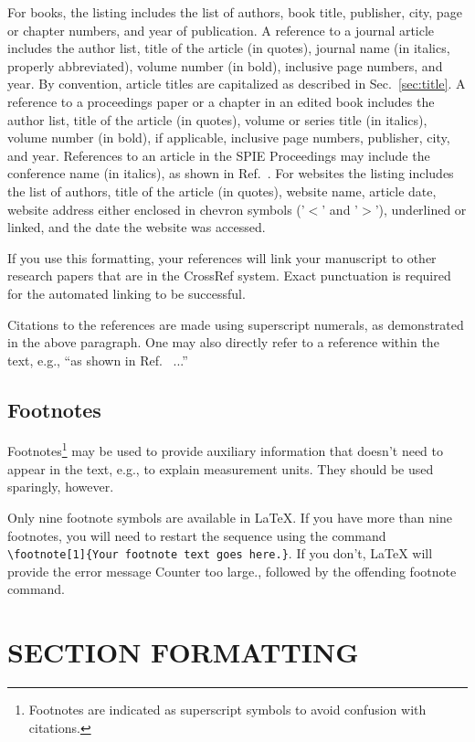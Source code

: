 \documentclass[]{spie}  %
\begin{document}
For books\cite{Lamport94,Alred03,Goossens97}, the listing includes the list of authors, book title, publisher, city, page or chapter numbers, and year of publication.  A reference to a journal article\cite{Metropolis53} includes the author list, title of the article (in quotes), journal name (in italics, properly abbreviated), volume number (in bold), inclusive page numbers, and year.  By convention\cite{Lamport94}, article titles are capitalized as described in Sec.~\ref{sec:title}.  A reference to a proceedings paper or a chapter in an edited book\cite{Gull89a} includes the author list, title of the article (in quotes), volume or series title (in italics), volume number (in bold), if applicable, inclusive page numbers, publisher, city, and year.  References to an article in the SPIE Proceedings may include the conference name (in italics), as shown in Ref.~. For websites\cite{Lees-Miller-LaTeX-course-1} the listing includes the list of authors, title of the article (in quotes), website name, article date, website address either enclosed in chevron symbols ('\(<\)' and '\(>\)'),  underlined or linked, and the date the website was accessed. 

If you use this formatting, your references will link your manuscript to other research papers that are in the CrossRef system. Exact punctuation is required for the automated linking to be successful. 

Citations to the references are made using superscript numerals, as demonstrated in the above paragraph.  One may also directly refer to a reference within the text, e.g., ``as shown in Ref.~ ...''

\subsection{Footnotes}
Footnotes\footnote{Footnotes are indicated as superscript symbols to avoid confusion with citations.} may be used to provide auxiliary information that doesn't need to appear in the text, e.g., to explain measurement units.  They should be used sparingly, however.  

Only nine footnote symbols are available in LaTeX. If you have more than nine footnotes, you will need to restart the sequence using the command  \verb|\footnote[1]{Your footnote text goes here.}|. If you don't, LaTeX will provide the error message {\ttfamily Counter too large.}, followed by the offending footnote command.

\section{SECTION FORMATTING}
\label{sec:sections}
\end{document}
